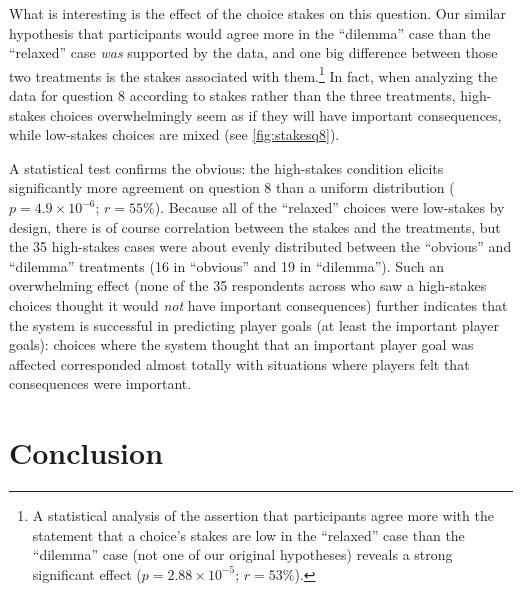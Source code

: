 What is interesting is the effect of the choice stakes on this question.
%
Our similar hypothesis that participants would agree more in the ``dilemma'' case than the ``relaxed'' case \emph{was} supported by the data, and one big difference between those two treatments is the stakes associated with them.\footnote{A statistical analysis of the assertion that participants agree more with the statement that a choice's stakes are low in the ``relaxed'' case than the ``dilemma'' case (not one of our original hypotheses) reveals a strong significant effect ($p = 2.88\times10^{-5}$; $r = 53\%$).}
%
In fact, when analyzing the data for question 8 according to stakes rather than the three treatments, high-stakes choices overwhelmingly seem as if they will have important consequences, while low-stakes choices are mixed (see \cref{fig:stakesq8}).


A statistical test confirms the obvious: the high-stakes condition elicits significantly more agreement on question 8 than a uniform distribution ($p = 4.9\times10^{-6}$; $r = 55$\%).
%
Because all of the ``relaxed'' choices were low-stakes by design, there is of course correlation between the stakes and the treatments, but the 35 high-stakes cases were about evenly distributed between the ``obvious'' and ``dilemma'' treatments (16 in ``obvious'' and 19 in ``dilemma'').
%
Such an overwhelming effect (none of the 35 respondents across who saw a high-stakes choices thought it would \emph{not} have important consequences) further indicates that the system is successful in predicting player goals (at least the important player goals): choices where the system thought that an important player goal was affected corresponded almost totally with situations where players felt that consequences were important.


\section{Conclusion}

